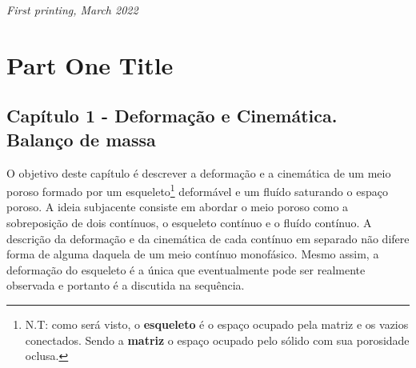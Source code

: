 \documentclass[
	11pt, %
	fleqn, %
	a4paper, %
]{LegrandOrangeBook}
\begin{document}
\noindent \textit{First printing, March 2022} %


\pagestyle{empty} %

\tableofcontents %

\listoffigures %

\listoftables %

\pagestyle{fancy} %

\cleardoublepage %


\part{Part One Title}


\chapterspaceabove{6.75cm} %
\chapterspacebelow{7.25cm} %


\chapter{Capítulo 1 - Deformação e Cinemática. Balanço de massa}

O objetivo deste capítulo é descrever a deformação e a cinemática de um meio poroso formado por um esqueleto\footnote{N.T: como será visto, o \textbf{esqueleto} é o espaço ocupado pela matriz e os vazios conectados. Sendo a \textbf{matriz} o espaço ocupado pelo sólido com sua porosidade oclusa.} deformável e um fluído saturando o espaço poroso. A ideia subjacente consiste em abordar o meio poroso como a sobreposição de dois contínuos, o esqueleto contínuo e o fluído contínuo. A descrição da deformação e da cinemática de cada contínuo em separado não difere forma de alguma daquela de um meio contínuo monofásico. Mesmo assim, a deformação do esqueleto é a única que eventualmente pode ser realmente observada e portanto é a discutida na sequência.
\end{document}

